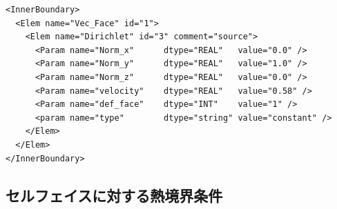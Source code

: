{
\small
\begin{verbatim}
<InnerBoundary>
  <Elem name="Vec_Face" id="1">
    <Elem name="Dirichlet" id="3" comment="source">
      <Param name="Norm_x"      dtype="REAL"   value="0.0" />
      <Param name="Norm_y"      dtype="REAL"   value="1.0" />
      <Param name="Norm_z"      dtype="REAL"   value="0.0" />
      <Param name="velocity"    dtype="REAL"   value="0.58" />
      <Param name="def_face"    dtype="INT"    value="1" />
      <param name="type"        dtype="string" value="constant" />
    </Elem>
  </Elem>
</InnerBoundary>
\end{verbatim}
}

%
\subsection{セルフェイスに対する熱境界条件}
